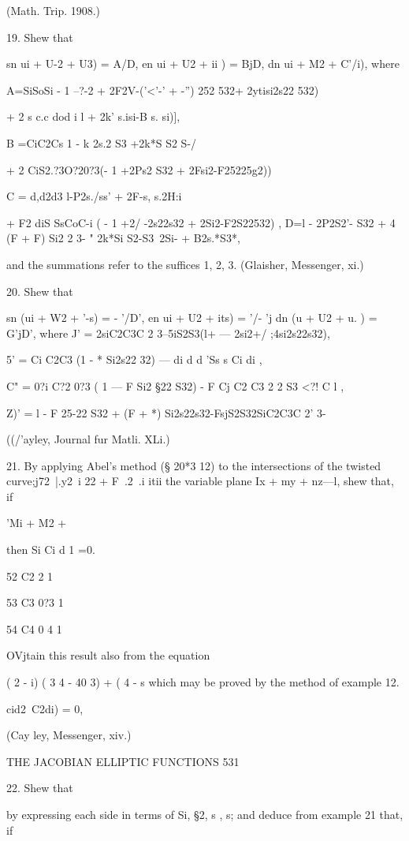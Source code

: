 (Math. Trip. 1908.)

19. Shew that

sn ui + U-2 + U3) = A/D, en ui + U2 + ii ) = BjD, dn ui + M2 + %
C'/i), where

A=SiSoSi - 1 --?-2 + 2F2V-('<'-' + -'') 252 532+ 2ytisi2s22 532)

+ 2 s c.c dod i l + 2k' s.isi-B s. si)],

B =CiC2Cs 1 - k 2s.2 S3 +2k*S S2 S-/

+ 2 CiS2.?3O?20?3(- 1 +2Ps2 S32 + 2Fsi2-F25225g2))

C = d,d2d3 l-P2s./ss' + 2F-s, s.2H:i

+ F2 diS SsCoC-i ( - 1 +2/ -2s22s32 + 2Si2-F2S22532) , D=l - 2P2S2'-
S32 + 4 (F + F) Si2 2 3- " 2k*Si S2-S3~2Si- + B2s.*S3*,

and the summations refer to the suffices 1, 2, 3. (Glaisher,
Messenger, xi.)

20. Shew that

sn (ui + W2 + '-s) = - '/D', en ui + U2 + its) = '/- 'j dn (u + U2 +
u. ) = G'jD', where J' = 2siC2C3C 2 3--5iS2S3(l+ — 2si2+/
;4si2s22s32),

5' = Ci C2C3 (1 - * Si2s22 32) — di d d 'Ss s Ci di ,

C" = 0?i C?2 0?3 ( 1 — F Si2 §22 S32) - F Cj C2 C3 2 2 S3 <?! C l ,

Z)' = l - F 25-22 S32 + (F + *) Si2s22s32-FsjS2S32SiC2C3C 2' 3-

((/'ayley, Journal fur Matli. XLi.)

21. By applying Abel's method (§ 20*3 12) to the intersections of the
twisted curve;j72\ |.y2\ i 22 + F\ .2\ .i itii the variable plane Ix
+ my + nz—l, shew that, if

'Mi + M2 + %

then Si Ci d 1 =0.

52 C2 2 1

53 C3 0?3 1

54 C4 0 4 1

OVjtain this result also from the equation

( 2 - i) ( 3 4 - 40 3) + ( 4 - s which may be proved by the method of
example 12.

 cid2~C2di) = 0,

(Cay ley, Messenger, xiv.)

THE JACOBIAN ELLIPTIC FUNCTIONS 531

22. Shew that

by expressing each side in terms of Si, §2, s , s; and deduce from
example 21 that, if

